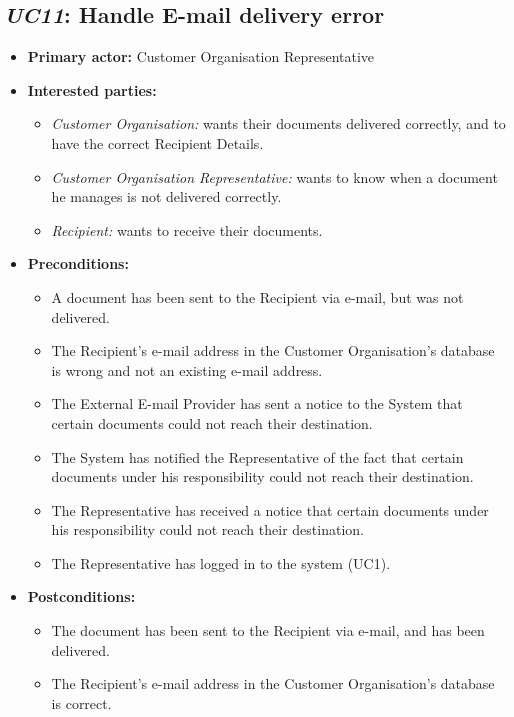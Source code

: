 \documentclass[a4paper,10pt]{article}
\begin{document}
\subsection{\emph{UC11}: Handle E-mail delivery error}
\begin{itemize}
    \item \textbf{Primary actor:} Customer Organisation Representative
    \item \textbf{Interested parties:} 
        \begin{itemize}
            \item \textit{Customer Organisation:} wants their documents delivered correctly, and to have the correct Recipient Details.
            \item \textit{Customer Organisation Representative:} wants to know when a document he manages is not delivered correctly.
            \item \textit{Recipient:} wants to receive their documents.
        \end{itemize}

    \item \textbf{Preconditions:}
        \begin{itemize}
            \item A document has been sent to the Recipient via e-mail, but was not delivered.
            \item The Recipient's e-mail address in the Customer Organisation's database is wrong and not an existing e-mail address.
            \item The External E-mail Provider has sent a notice to the System that certain documents could not reach their destination.
            \item The System has notified the Representative of the fact that certain documents under his responsibility could not reach their destination.
            \item The Representative has received a notice that certain documents under his responsibility could not reach their destination.
            \item The Representative has logged in to the system (UC1).
        \end{itemize}

    \item \textbf{Postconditions:}
        \begin{itemize}
            \item The document has been sent to the Recipient via e-mail, and has been delivered.
            \item The Recipient's e-mail address in the Customer Organisation's database is correct.
        \end{itemize}
        

\end{itemize}
\end{document}

